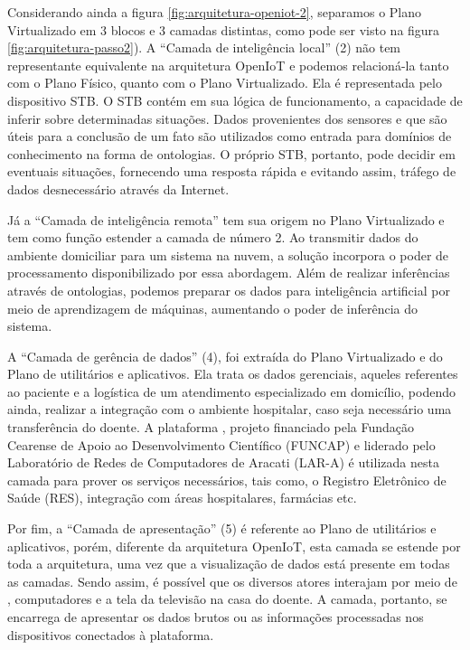 
Considerando ainda a figura \ref{fig:arquitetura-openiot-2}, separamos o Plano
Virtualizado em 3 blocos e 3 camadas distintas, como pode ser visto na figura
\ref{fig:arquitetura-passo2}). A ``Camada de inteligência local'' (2) não tem
representante equivalente na arquitetura OpenIoT e podemos relacioná-la tanto
com o Plano Físico, quanto com o Plano Virtualizado. Ela é representada pelo
dispositivo STB.  O STB contém em sua lógica de funcionamento, a capacidade de
inferir sobre determinadas situações. Dados provenientes dos sensores e que são
úteis para a conclusão de um fato são utilizados como entrada para domínios de
conhecimento na forma de ontologias. O próprio STB, portanto, pode decidir em
eventuais situações, fornecendo uma resposta rápida e evitando assim, tráfego
de dados desnecessário através da Internet.


Já a ``Camada de inteligência remota'' tem sua origem no Plano Virtualizado e
tem como função estender a camada de número 2. Ao transmitir dados do ambiente
domiciliar para um sistema na nuvem, a solução incorpora o poder de
processamento disponibilizado por essa abordagem. Além de realizar inferências
através de ontologias, podemos preparar os dados para inteligência artificial
por meio de aprendizagem de máquinas, aumentando o poder de inferência do
sistema.

A ``Camada de gerência de dados'' (4), foi extraída do Plano Virtualizado e do
Plano de utilitários e aplicativos. Ela trata os dados gerenciais, aqueles
referentes ao paciente e a logística de um atendimento especializado em
domicílio, podendo ainda, realizar a integração com o ambiente hospitalar, caso
seja necessário uma transferência do doente. A plataforma \nextsaude[],
projeto financiado pela Fundação Cearense de Apoio ao Desenvolvimento Científico 
(FUNCAP) e liderado pelo Laboratório de Redes de Computadores de Aracati (LAR-A) 
é utilizada nesta camada para prover os serviços necessários, tais como, o 
Registro Eletrônico de Saúde (RES), integração com áreas hospitalares, farmácias etc.

Por fim, a ``Camada de apresentação'' (5) é referente ao Plano de utilitários e
aplicativos, porém, diferente da arquitetura OpenIoT, esta camada se estende por
toda a arquitetura, uma vez que a visualização de dados está presente em todas 
as camadas. Sendo assim, é possível que os diversos atores interajam por meio de
\smartphones, computadores e a tela da televisão na casa do doente.
A camada, portanto, se encarrega de apresentar os dados brutos ou as informações
processadas nos dispositivos conectados à plataforma. 

